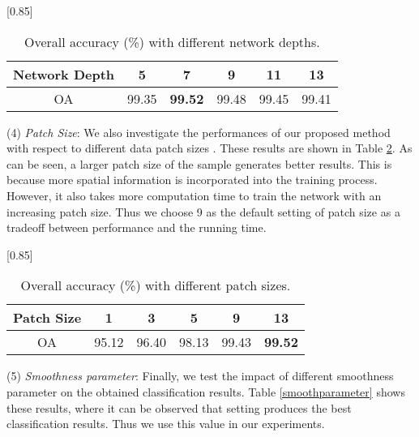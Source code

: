 \documentclass[journal]{IEEEtran}
\begin{document}
		\begin{table}[htp]
			\caption{\label{networkdepth} {{Overall accuracy (\%) with different network depths.}}}
			\begin{center}
				{\normalsize
					\scalebox{0.85}[0.85]
					{
						\begin{tabular}{|c|c|c|c|c|c|}
							\hline
							Network Depth   & 5      & 7   & 9     & 11    & 13 \\
							\hline
							OA              & 99.35  & \bf{99.52} & 99.48 & 99.45  & 99.41 \\
							\hline
						\end{tabular}
					}
				}
			\end{center}
		\end{table}
		
		(4) \textit{Patch Size}: We also investigate the performances of our proposed method with respect to different data patch sizes . These results are shown in Table \ref{patchsize}. As can be seen, a larger patch size of the sample generates better results. This is because more spatial information is incorporated into the training process. However, it also takes more computation time to train the network with an increasing patch size. Thus we choose 9 as the default setting of patch size as a tradeoff between performance and the running time.
		
		\begin{table}[htp]
			\caption{\label{patchsize} {{Overall accuracy (\%) with different patch sizes.}}}
			\begin{center}
				{\normalsize
					\scalebox{0.85}[0.85]
					{
						\begin{tabular}{|c|c|c|c|c|c|}
							\hline
							Patch Size   & 1      & 3      & 5     & 9     & 13 \\
							\hline
							OA           & 95.12  & 96.40  & 98.13 & 99.43 & \bf{99.52} \\
							\hline
						\end{tabular}
					}
				}
			\end{center}
		\end{table}
		
		(5) \textit{Smoothness parameter}: Finally, we test the impact of different smoothness parameter  on the obtained {{classification}} results. Table \ref{smoothparameter} shows these results, where it can be observed that setting  produces the best {{classification}} results. Thus we use this value in our experiments.
		
\end{document}
